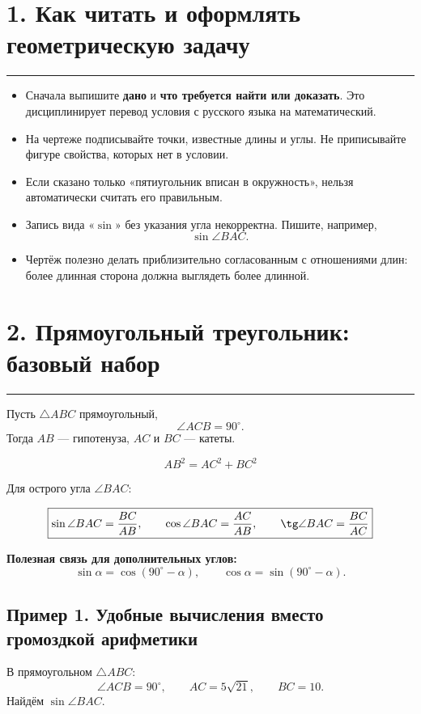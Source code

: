 \documentclass[a4paper,12pt]{article}
\newcommand{\sectionrule}{
  \par
  \vspace{0.2em}
  \noindent
  \textcolor{accent}{\rule{\linewidth}{0.7pt}}
  \vspace{0.35em}
}
\newcommand{\key}[1]{\textbf{\textcolor{darkaccent}{#1}}}
\newcommand{\formula}[1]{\[\boxed{#1}\]}
\begin{document}
\section*{1. Как читать и оформлять геометрическую задачу}
\sectionrule

\begin{itemize}
  \item Сначала выпишите \key{дано} и \key{что требуется найти или доказать}.
  Это дисциплинирует перевод условия с русского языка на математический.

  \item На чертеже подписывайте точки, известные длины и углы.
  Не приписывайте фигуре свойства, которых нет в условии.

  \item Если сказано только «пятиугольник вписан в окружность»,
  нельзя автоматически считать его правильным.

  \item Запись вида «\(\sin\)» без указания угла некорректна.
  Пишите, например,
  \[
  \sin\angle BAC.
  \]

  \item Чертёж полезно делать приблизительно согласованным
  с отношениями длин: более длинная сторона должна выглядеть
  более длинной.
\end{itemize}

\section*{2. Прямоугольный треугольник: базовый набор}
\sectionrule

Пусть \(\triangle ABC\) прямоугольный,
\[
\angle ACB=90^\circ.
\]
Тогда \(AB\) --- гипотенуза, \(AC\) и \(BC\) --- катеты.

\formula{AB^2=AC^2+BC^2}

Для острого угла \(\angle BAC\):

\formula{
\sin\angle BAC=\frac{BC}{AB},
\qquad
\cos\angle BAC=\frac{AC}{AB},
\qquad
\tg\angle BAC=\frac{BC}{AC}
}

\key{Полезная связь для дополнительных углов:}
\[
\sin\alpha=\cos(90^\circ-\alpha),
\qquad
\cos\alpha=\sin(90^\circ-\alpha).
\]

\subsection*{Пример 1. Удобные вычисления вместо громоздкой арифметики}

В прямоугольном \(\triangle ABC\):
\[
\angle ACB=90^\circ,
\qquad
AC=5\sqrt{21},
\qquad
BC=10.
\]
Найдём \(\sin\angle BAC\).
\end{document}
